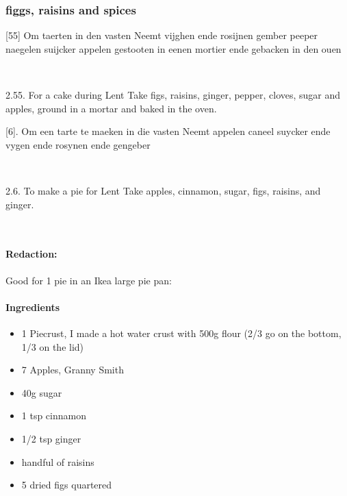 \documentclass[a4paper]{article}
\begin{document}
\subsubsection{figgs, raisins and spices}
\medskip
\begin{minipage}{.45\textwidth}
[55]  Om taerten in den vasten 
Neemt vijghen ende rosijnen gember peeper naegelen suijcker appelen gestooten in eenen mortier ende gebacken in den ouen	\cite{KANTL15}
\end{minipage}
\begin{minipage}{0.05\textwidth}
\ \ \ 
\end{minipage}
\begin{minipage}{.45\textwidth}
2.55. For a cake during Lent
Take figs, raisins, ginger, pepper, cloves, sugar and apples, ground in a mortar and baked in the oven. \cite{KANTL15}
\end{minipage}



\medskip
\begin{minipage}{.45\textwidth}
[6]. Om een tarte te maeken in die vasten Neemt appelen caneel suycker ende vygen ende rosynen ende gengeber \cite{KANTL15}	
\end{minipage}
\begin{minipage}{0.05\textwidth}
\ \ \ 
\end{minipage}
\begin{minipage}{.45\textwidth}
2.6. To make a pie for Lent
Take apples, cinnamon, sugar, figs, raisins, and ginger. \cite{KANTL15}
\end{minipage}
\ \ \ 
\paragraph{Redaction:}
Good for 1 pie in an Ikea large pie pan:

\paragraph{Ingredients}
\begin{itemize}
\item 1 Piecrust, I made a hot water crust with 500g flour (2/3 go on the bottom, 1/3 on the lid)
\item 7 Apples, Granny Smith
\item 40g sugar
\item 1 tsp cinnamon
\item 1/2 tsp ginger
\item handful of raisins
\item 5 dried figs quartered
\end{itemize}
\end{document}
